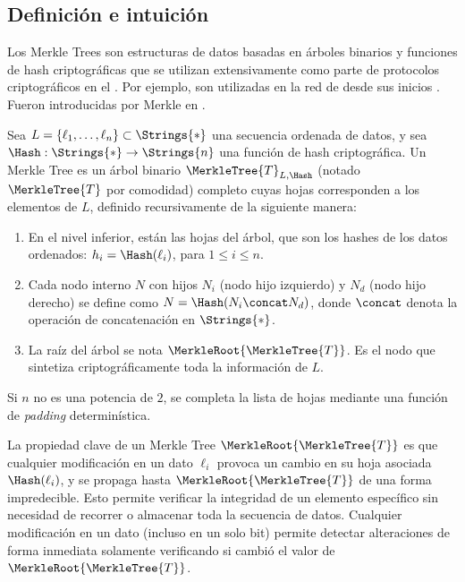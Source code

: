 
\subsection{Definición e intuición}

Los Merkle Trees son estructuras de datos basadas en árboles binarios y funciones de hash criptográficas que se utilizan extensivamente como parte de protocolos criptográficos en el \ROM. Por ejemplo, son utilizadas en la red de \Bitcoin desde sus inicios \cite{nakamoto2009bitcoin}. Fueron introducidas por Merkle en \cite{Merkle1988}.

\begin{definition}
	Sea $L = \{\ell_1, \ldots, \ell_n\} \subset \Strings{*}$ una secuencia ordenada de datos, y sea $\Hash: \Strings{*} \to \Strings{n}$ una función de hash criptográfica. Un Merkle Tree es un árbol binario $\MerkleTree{T}_{L,\Hash}$ (notado $\MerkleTree{T}$ por comodidad) completo cuyas hojas corresponden a los elementos de $L$, definido recursivamente de la siguiente manera:
	\begin{enumerate}
		\item En el nivel inferior, están las hojas del árbol, que son los hashes de los datos ordenados: $h_i = \Hash(\ell_i)$, para $1 \leq i \leq n$.
		\item Cada nodo interno $N$ con hijos $N_i$ (nodo hijo izquierdo) y $N_d$ (nodo hijo derecho) se define como $N = \Hash(N_i \concat N_d)$, donde $\concat$ denota la operación de concatenación en $\Strings{*}$.
		\item La raíz del árbol se nota $\MerkleRoot{\MerkleTree{T}}$. Es el nodo que sintetiza criptográficamente toda la información de $L$.
	\end{enumerate}
	 Si $n$ no es una potencia de $2$, se completa la lista de hojas mediante una función de \textit{padding} determinística.
\end{definition}

La propiedad clave de un Merkle Tree $\MerkleRoot{\MerkleTree{T}}$ es que cualquier modificación en un dato $\ell_i$ provoca un cambio en su hoja asociada $\Hash(\ell_i)$, y se propaga hasta $\MerkleRoot{\MerkleTree{T}}$ de una forma impredecible. Esto permite verificar la integridad de un elemento específico sin necesidad de recorrer o almacenar toda la secuencia de datos. Cualquier modificación en un dato (incluso en un solo bit) permite detectar alteraciones de forma inmediata solamente verificando si cambió el valor de $\MerkleRoot{\MerkleTree{T}}$.

